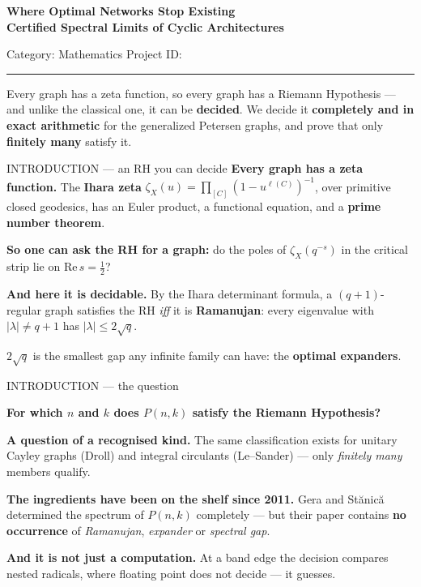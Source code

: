 \documentclass[aspectratio=169,14pt]{beamer}
\newcommand{\key}[1]{\textcolor{myblue}{\textbf{#1}}}
\newcommand{\kb}[1]{\begin{center}\colorbox{mylight}{\parbox{0.94\textwidth}{#1}}\end{center}}
\begin{document}
\begin{frame}[plain]
\vfill
\begin{center}
{\color{myblue}\bfseries\large
Where Optimal Networks Stop Existing\\[0.25em]
Certified Spectral Limits of Cyclic Architectures\par}
\vspace{1.0em}
Category: Mathematics \qquad Project ID: \rule{3cm}{0.4pt}
\end{center}
\vfill
\kb{\centering Every graph has a zeta function, so every graph has a Riemann
Hypothesis --- and unlike the classical one, it can be \key{decided}. We decide
it \key{completely and in exact arithmetic} for the generalized Petersen graphs,
and prove that only \key{finitely many} satisfy it.}
\vfill
\end{frame}

\begin{frame}{INTRODUCTION --- an RH you can decide}
\key{Every graph has a zeta function.} The \key{Ihara zeta}
$\zeta_X(u)=\prod_{[C]}(1-u^{\ell(C)})^{-1}$, over primitive closed geodesics,
has an Euler product, a functional equation, and a \key{prime number theorem}.

\key{So one can ask the RH for a graph:} do the poles of $\zeta_X(q^{-s})$ in
the critical strip lie on $\mathrm{Re}\,s=\tfrac12$?

\key{And here it is decidable.} By the Ihara determinant formula, a
$(q+1)$-regular graph satisfies the RH \emph{iff} it is \key{Ramanujan}: every
eigenvalue with $|\lambda|\ne q+1$ has $|\lambda|\le2\sqrt q$.

\kb{$2\sqrt q$ is the smallest gap any infinite family can have: the
\key{optimal expanders}.}
\end{frame}

\begin{frame}{INTRODUCTION --- the question}
\kb{\centering\key{For which $n$ and $k$ does $P(n,k)$ satisfy the Riemann
Hypothesis?}}

\key{A question of a recognised kind.} The same classification exists for
unitary Cayley graphs (Droll) and integral circulants (Le--Sander) --- only
\emph{finitely many} members qualify.

\key{The ingredients have been on the shelf since 2011.} Gera and St\u{a}nic\u{a}
determined the spectrum of $P(n,k)$ completely --- but their paper contains
\key{no occurrence} of \emph{Ramanujan}, \emph{expander} or \emph{spectral gap}.

\key{And it is not just a computation.} At a band edge the decision compares
nested radicals, where floating point does not decide --- it guesses.
\end{frame}
\end{document}
